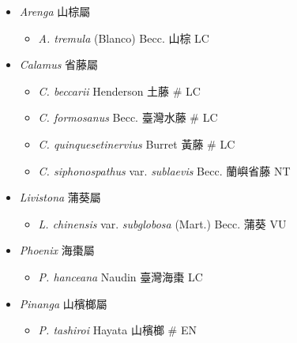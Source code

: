 
  \begin{itemize}
 \item[] \textit{Arenga} 山棕屬
                                
  \begin{itemize}
        \item[] \textit{A. tremula} (Blanco) Becc.  山棕   LC
  \end{itemize}
 \item[] \textit{Calamus} 省藤屬
                                
  \begin{itemize}
        \item[] \textit{C. beccarii} Henderson  土藤  \# LC
        \item[] \textit{C. formosanus} Becc.  臺灣水藤  \# LC
        \item[] \textit{C. quinquesetinervius} Burret  黃藤  \# LC
        \item[] \textit{C. siphonospathus} var. \textit{sublaevis} Becc.  蘭嶼省藤   NT
  \end{itemize}
 \item[] \textit{Livistona} 蒲葵屬
                                
  \begin{itemize}
        \item[] \textit{L. chinensis} var. \textit{subglobosa} (Mart.) Becc.  蒲葵   VU
  \end{itemize}
 \item[] \textit{Phoenix} 海棗屬
                                
  \begin{itemize}
        \item[] \textit{P. hanceana} Naudin  臺灣海棗   LC
  \end{itemize}
 \item[] \textit{Pinanga} 山檳榔屬
                                
  \begin{itemize}
        \item[] \textit{P. tashiroi} Hayata  山檳榔  \# EN
  \end{itemize}
  \end{itemize}

